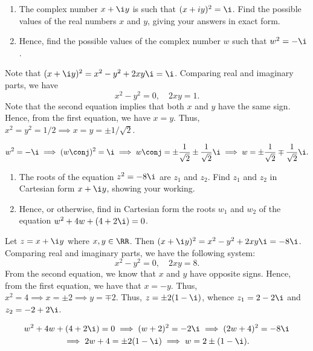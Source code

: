 \begin{problem}
    \begin{enumerate}
        \item The complex number $x + \i y$ is such that $(x + iy)^2 = \i$. Find the possible values of the real numbers $x$ and $y$, giving your answers in exact form.
        \item Hence, find the possible values of the complex number $w$ such that $w^2 = -\i$.
    \end{enumerate}
\end{problem}
\begin{solution}
    \begin{ppart}
        Note that $(x+\i y)^2 = x^2 - y^2 + 2xy\i = \i$. Comparing real and imaginary parts, we have \[x^2 - y^2 = 0, \quad 2xy = 1.\] Note that the second equation implies that both $x$ and $y$ have the same sign. Hence, from the first equation, we have $x = y$. Thus, $x^2 = y^2 = 1/2 \implies x = y = \pm 1/\sqrt2$.
    \end{ppart}
    \begin{ppart}
        \[w^2 = -\i \implies (w\conj)^2 = \i \implies w\conj = \pm\frac1{\sqrt2} \pm \frac1{\sqrt2}\i \implies w = \pm\frac1{\sqrt2} \mp \frac1{\sqrt2}\i.\]
    \end{ppart}
\end{solution}

\clearpage
\begin{problem}
    \begin{enumerate}
        \item The roots of the equation $z^2 = -8\i$ are $z_1$ and $z_2$. Find $z_1$ and $z_2$ in Cartesian form $x + \i y$, showing your working.
        \item Hence, or otherwise, find in Cartesian form the roots $w_1$ and $w_2$ of the equation $w^2 + 4w + (4 + 2\i) = 0$.
    \end{enumerate}
\end{problem}
\begin{solution}
    \begin{ppart}
        Let $z = x + \i y$ where $x, y \in \RR$. Then $(x+\i y)^2 = x^2 - y^2 + 2xy\i = -8\i$. Comparing real and imaginary parts, we have the following system: \[x^2 - y^2 = 0, \quad 2xy = 8.\] From the second equation, we know that $x$ and $y$ have opposite signs. Hence, from the first equation, we have that $x = -y$. Thus, $x^2 = 4 \implies x = \pm 2 \implies y = \mp 2$. Thus, $z = \pm2 (1-\i)$, whence $z_1 = 2 - 2\i$ and $z_2 = -2 + 2\i$.
    \end{ppart}
    \begin{ppart}
        \begin{gather*}
            w^2 + 4w + (4 + 2\i) = 0 \implies (w + 2)^2 = -2\i \implies (2w + 4)^2 = -8\i\\
            \implies 2w + 4 = \pm2 (1 - \i) \implies w = 2 \pm (1 - \i).
        \end{gather*}
    \end{ppart}
\end{solution}

